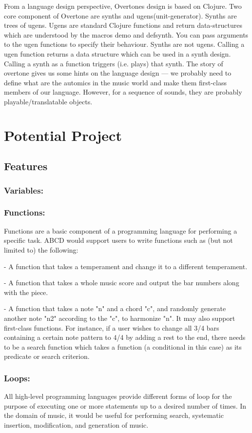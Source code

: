 From a language design perspective, Overtones design is based on Clojure. Two core component of Overtone are synths and ugens(unit-generator). Synths are trees of ugens. Ugens are standard Clojure functions and return data-structures which are understood by the macros demo and defsynth. You can pass arguments to the ugen functions to specify their behaviour. Synths are not ugens. Calling a ugen function returns a data structure which can be used in a synth design. Calling a synth as a function triggers (i.e. plays) that synth.\cite{Aaron14} The story of overtone gives us some hints on the language design --- we probably need to define what are the automics in the music world and make them first-class members of our language. However, for a sequence of sounds, they are probably playable/translatable objects.


\section{Potential Project}

\subsection{Features}
	\subsubsection{Variables:}
	\subsubsection{Functions:}
	Functions are a basic component of a programming language for performing a specific task. ABCD would support users to write functions such as (but not limited to) the following:

	- A function that takes a temperament and change it to a different temperament.

 	- A function that takes a whole music score and output the bar numbers along with the piece.
 	
	- A function that takes a note "n" and a chord "c", and randomly generate another note "n2" according to the "c", to harmonize "n".
	  It may also support first-class functions. For instance, if a user wishes to change all 3/4 bars containing a certain note pattern to 4/4 by adding a rest to the end, there needs to be a search function which takes a function (a conditional in this case) as its predicate or search criterion. 

	\subsubsection{Loops:}
	All high-level programming languages provide different forms of loop for the purpose of executing one or more statements up to a desired number of times. In the domain of music, it would be useful for performing search, systematic insertion, modification, and generation of music. 

